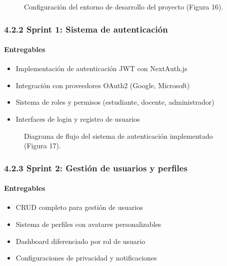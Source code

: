 \begin{figure}[H]
	\centering
	\caption{Configuración del entorno de desarrollo del proyecto (Figura 16).}
	\label{fig:dev-environment}
\end{figure}

\subsubsection{4.2.2 Sprint 1: Sistema de autenticación}

\paragraph{Entregables}
\begin{itemize}
\item Implementación de autenticación JWT con NextAuth.js
\item Integración con proveedores OAuth2 (Google, Microsoft)
\item Sistema de roles y permisos (estudiante, docente, administrador)
\item Interfaces de login y registro de usuarios
\end{itemize}

\begin{figure}[H]
	\centering
	\caption{Diagrama de flujo del sistema de autenticación implementado (Figura 17).}
	\label{fig:auth-flow}
\end{figure}

\subsubsection{4.2.3 Sprint 2: Gestión de usuarios y perfiles}

\paragraph{Entregables}
\begin{itemize}
\item CRUD completo para gestión de usuarios
\item Sistema de perfiles con avatares personalizables
\item Dashboard diferenciado por rol de usuario
\item Configuraciones de privacidad y notificaciones
\end{itemize}

